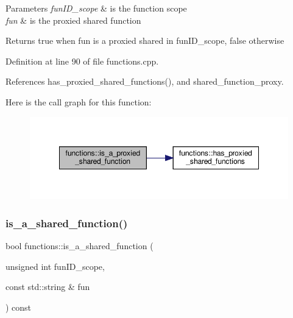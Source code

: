 \begin{DoxyParams}{Parameters}
{\em fun\+I\+D\+\_\+scope} & is the function scope \\
\hline
{\em fun} & is the proxied shared function \\
\hline
\end{DoxyParams}
\begin{DoxyReturn}{Returns}
true when fun is a proxied shared in fun\+I\+D\+\_\+scope, false otherwise 
\end{DoxyReturn}


Definition at line 90 of file functions.\+cpp.



References has\+\_\+proxied\+\_\+shared\+\_\+functions(), and shared\+\_\+function\+\_\+proxy.

Here is the call graph for this function\+:
\nopagebreak
\begin{figure}[H]
\begin{center}
\leavevmode
\includegraphics[width=348pt]{dd/d03/classfunctions_ab0dc3920fb572cb4fb7da178bf285619_cgraph}
\end{center}
\end{figure}
\mbox{\label{classfunctions_a931331a26c67b312ee68dce38648046f}} 
\subsubsection{\texorpdfstring{is\+\_\+a\+\_\+shared\+\_\+function()}{is\_a\_shared\_function()}}
{\footnotesize\ttfamily bool functions\+::is\+\_\+a\+\_\+shared\+\_\+function (\begin{DoxyParamCaption}\item[{unsigned int}]{fun\+I\+D\+\_\+scope,  }\item[{const std\+::string \&}]{fun }\end{DoxyParamCaption}) const}



